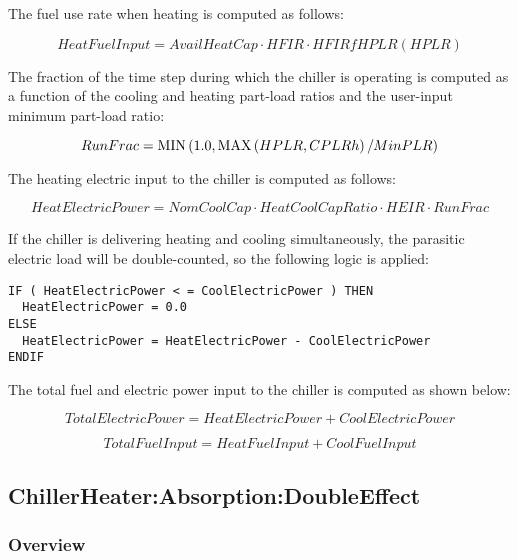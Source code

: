 The fuel use rate when heating is computed as follows:

\begin{equation}
HeatFuelInput = AvailHeatCap \cdot HFIR \cdot HFIRfHPLR(HPLR)
\end{equation}

The fraction of the time step during which the chiller is operating is computed as a function of the cooling and heating part-load ratios and the user-input minimum part-load ratio:

\begin{equation}
RunFrac = {\mathop{\rm MIN}\nolimits} \left( {1.0,{\mathop{\rm MAX}\nolimits} \left( {HPLR,CPLRh} \right)/MinPLR} \right)
\end{equation}

The heating electric input to the chiller is computed as follows:

\begin{equation}
HeatElectricPower = NomCoolCap \cdot HeatCoolCapRatio \cdot HEIR \cdot RunFrac
\end{equation}

If the chiller is delivering heating and cooling simultaneously, the parasitic electric load will be double-counted, so the following logic is applied:

\begin{lstlisting}
IF ( HeatElectricPower < = CoolElectricPower ) THEN
  HeatElectricPower = 0.0
ELSE
  HeatElectricPower = HeatElectricPower - CoolElectricPower
ENDIF
\end{lstlisting}

The total fuel and electric power input to the chiller is computed as shown below:

\begin{equation}
TotalElectricPower = HeatElectricPower + CoolElectricPower
\end{equation}

\begin{equation}
TotalFuelInput = HeatFuelInput + CoolFuelInput
\end{equation}

\subsection{ChillerHeater:Absorption:DoubleEffect}\label{chillerheaterabsorptiondoubleeffect}

\subsubsection{Overview}\label{overview-1-003}

